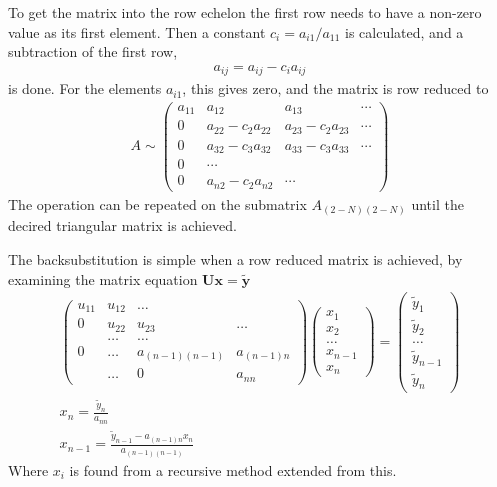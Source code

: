 \documentclass[11pt,a4paper,english,draft]{article}
\numberwithin{equation}{section}
\newcommand{\ve}[1]{\mathbf{#1}} %
\begin{document}
To get the matrix into the row echelon the first row needs to have a non-zero
value as its first element. Then a constant $c_i = a_{i1}/a_{11}$ is 
calculated, and a subtraction of the first row,
\begin{gather}
a_{ij} = a_{ij} - c_i a_{ij}
\end{gather}
is done. For the elements $a_{i1}$, this gives zero, and the matrix is
row reduced to
\begin{gather}
A \sim
\begin{pmatrix}
    a_{11} & a_{12} & a_{13} & \cdots\\
    0 & a_{22} - c_2 a_{22} & a_{23} - c_2 {a}_{23} & \cdots\\
    0 & a_{32} - c_3 a_{32} & a_{33} - c_3 a_{33} & \cdots\\
    0 & \cdots \\
    0 & a_{n2} - c_2 a_{n2} & \cdots
\end{pmatrix}
\end{gather}
The operation can be repeated on the submatrix $A_{(2-N)(2-N)}$
until the decired triangular matrix is achieved.

The backsubstitution is simple when a row reduced matrix is achieved,
by examining the matrix equation $\ve{U}\ve{x} = \ve{\tilde{y}}$
\begin{gather}
\begin{pmatrix} u_{11} & u_{12} & \dots\\
                0 & u_{22} & u_{23} & \dots\\
                &\dots & \dots\\
                0 & \dots & a_{(n-1)(n-1)} & a_{(n-1)n} \\
                & \dots & 0 & a_{nn}
\end{pmatrix} \begin{pmatrix} x_1 \\ x_2 \\ \dots \\ x_{n-1}\\ x_n \end{pmatrix}
 = \begin{pmatrix} \tilde{y}_1 \\ \tilde{y}_2 \\ \dots\\ \tilde{y}_{n-1} \\ \tilde{y}_n \end{pmatrix}\\
 x_n = \frac{\tilde{y}_n}{a_{nn}}\\
 x_{n-1} = \frac{\tilde{y}_{n-1} - a_{(n-1)n}x_n}{a_{(n-1)(n-1)}}
\end{gather}
Where $x_{i}$ is found from a recursive method extended from this.
\end{document}
